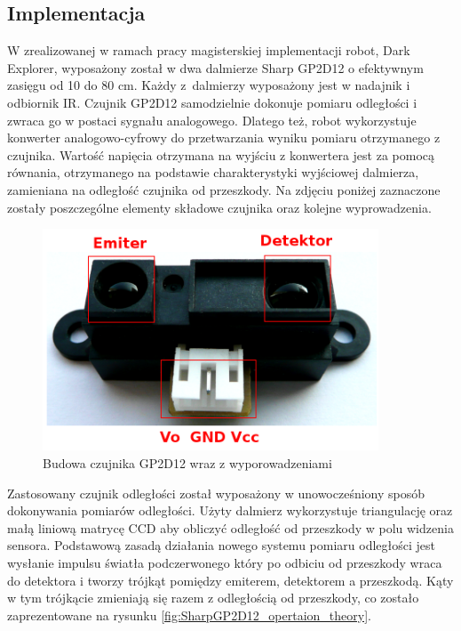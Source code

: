 \subsection{Implementacja}
W zrealizowanej w ramach pracy magisterskiej implementacji robot, Dark Explorer,
wyposażony został w dwa dalmierze Sharp GP2D12 o efektywnym zasięgu od 10 do 80
cm. Każdy z~dalmierzy wyposażony jest w nadajnik i odbiornik IR. Czujnik
GP2D12 samodzielnie dokonuje pomiaru odległości i zwraca go w postaci sygnału
analogowego. Dlatego też, robot wykorzystuje konwerter analogowo-cyfrowy do
przetwarzania wyniku pomiaru otrzymanego z czujnika. Wartość napięcia otrzymana
na wyjściu z konwertera jest za pomocą równania, otrzymanego na podstawie
charakterystyki wyjściowej dalmierza, zamieniana na odległość czujnika od
przeszkody. Na zdjęciu poniżej zaznaczone zostały poszczególne elementy składowe
czujnika oraz kolejne wyprowadzenia.

\begin{figure}[hb]
 \centering
 \includegraphics[width=100mm]{../images/ch04/real_gp2d12_view.png}
 \caption{Budowa czujnika GP2D12 wraz z wyporowadzeniami}
 \label{fig:SharpGP2D12}
\end{figure}

Zastosowany czujnik odległości został wyposażony w unowocześniony sposób
dokonywania pomiarów odległości. Użyty dalmierz wykorzystuje triangulację oraz
małą liniową matrycę CCD aby obliczyć odległość od przeszkody w polu
widzenia sensora\cite{website:acroname-robotics}. Podstawową zasadą działania
nowego systemu pomiaru odległości jest wysłanie impulsu światła podczerwonego który po odbiciu od przeszkody wraca
do detektora i tworzy trójkąt pomiędzy emiterem, detektorem a przeszkodą. Kąty w
tym trójkącie zmieniają się razem z odległością od przeszkody, co zostało
zaprezentowane na rysunku \ref{fig:SharpGP2D12_opertaion_theory}.


